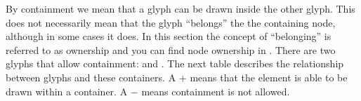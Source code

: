 By containment we mean that a glyph can be drawn inside the other glyph. This does not necessarily mean that the glyph ``belongs'' the the containing node, although in some cases it does. In this section the concept of ``belonging'' is referred to as ownership and you can find node ownership in . There are two glyphs that allow containment:  and . The next table describes the relationship between \PD glyphs and these containers. A $+$ means that the element is able to be drawn within a container. A $-$ means containment is not allowed.

\begin{center}
\tablelasttail{\hline}


\end{center}
